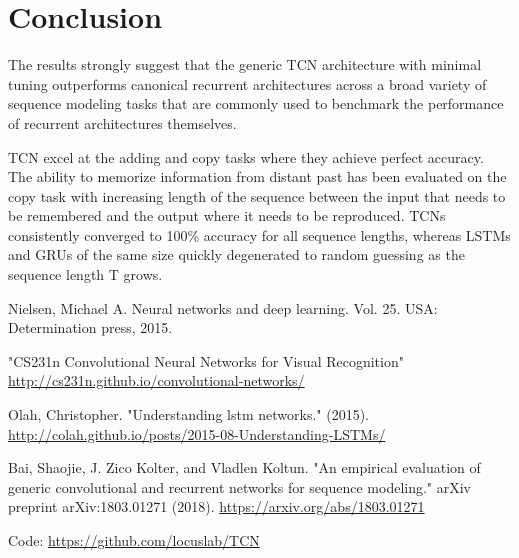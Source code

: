 \documentclass[12pt, titlepage]{article}
\begin{document}
\section{Conclusion}
The results strongly suggest that the generic TCN architecture with minimal tuning outperforms canonical recurrent architectures across a broad variety of sequence modeling tasks that are commonly used to benchmark the performance of recurrent architectures themselves. 

TCN excel at the adding and copy tasks where they achieve perfect accuracy. The ability to memorize information from distant past has been evaluated on the copy task with increasing length of the sequence between the input that needs to be remembered and the output where it needs to be reproduced. TCNs consistently converged to 100\% accuracy for all sequence lengths, whereas LSTMs and GRUs of the same size quickly degenerated to random guessing as the sequence length T grows.



\clearpage

\begin{thebibliography}{0}
   Nielsen, Michael A. Neural networks and deep learning. Vol. 25. USA: Determination press, 2015.
  
   "CS231n Convolutional Neural Networks for Visual Recognition" \url{http://cs231n.github.io/convolutional-networks/}
  
   Olah, Christopher. "Understanding lstm networks." (2015). \url{http://colah.github.io/posts/2015-08-Understanding-LSTMs/}
  
   Bai, Shaojie, J. Zico Kolter, and Vladlen Koltun. "An empirical evaluation of generic convolutional and recurrent networks for sequence modeling." arXiv preprint arXiv:1803.01271 (2018). \url{https://arxiv.org/abs/1803.01271} 
  
  Code: \url{https://github.com/locuslab/TCN}
  
  


  
  
  
  
  \end{thebibliography}


 
\end{document}
